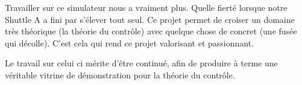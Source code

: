 \documentclass[a4paper,11pt]{article}
\begin{document}
    Travailler sur ce simulateur nous a vraiment plus. Quelle fierté lorsque notre Shuttle A a fini par s'élever tout seul. 
    Ce projet permet de croiser un domaine très théorique (la théorie du contrôle) avec quelque chose de concret (une fusée qui décolle). C'est cela qui rend ce projet valorisant et passionnant.
    
    Le travail sur celui ci mérite d'être continué, afin de produire à terme une véritable vitrine de démonstration pour la théorie du contrôle.


\end{document}
